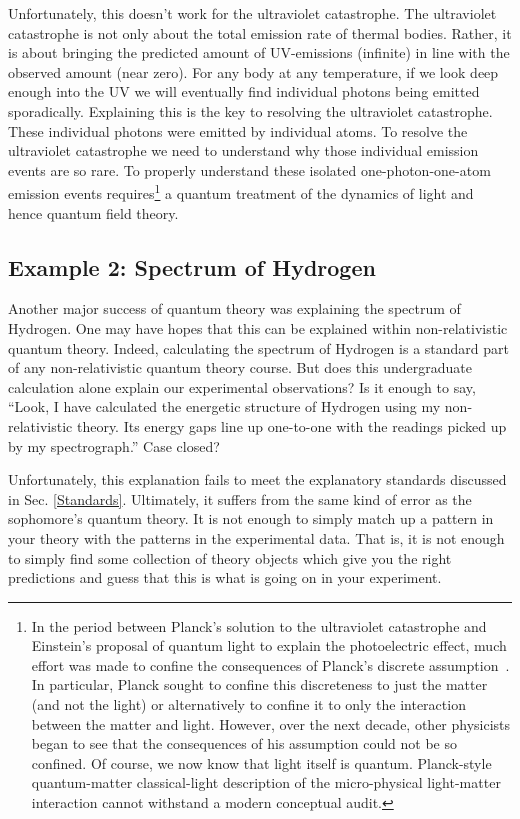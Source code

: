 \documentclass[12pt,prd,superscriptaddress,floatfix,amsmath,amssymb,amsfonts,nofootinbib]{revtex4-2}
\begin{document}
Unfortunately, this doesn't work for the ultraviolet catastrophe. The ultraviolet catastrophe is not only about the total emission rate of thermal bodies. Rather, it is about bringing the predicted amount of UV-emissions (infinite) in line with the observed amount (near zero). For any body at any temperature, if we look deep enough into the UV we will eventually find individual photons being emitted sporadically. Explaining this is the key to resolving the ultraviolet catastrophe. These individual photons were emitted by individual atoms. To resolve the ultraviolet catastrophe we need to understand why those individual emission events are so rare. To properly understand these isolated one-photon-one-atom emission events requires\footnote{In the period between Planck's solution to the ultraviolet catastrophe and Einstein's proposal of quantum light to explain the photoelectric effect, much effort was made to confine the consequences of Planck's discrete assumption~\cite{PlanckHistory}. In particular, Planck sought to confine this discreteness to just the matter (and not the light) or alternatively to confine it to only the interaction between the matter and light. However, over the next decade, other physicists began to see that the consequences of his assumption could not be so confined. Of course, we now know that light itself is quantum. Planck-style quantum-matter classical-light description of the micro-physical light-matter interaction cannot withstand a modern conceptual audit.} a quantum treatment of the dynamics of light and hence quantum field theory.

\subsection{Example 2: Spectrum of Hydrogen}
Another major success of quantum theory was explaining the spectrum of Hydrogen. One may have hopes that this can be explained within non-relativistic quantum theory. Indeed, calculating the spectrum of Hydrogen is a standard part of any non-relativistic quantum theory course. But does this undergraduate calculation alone explain our experimental observations? Is it enough to say, ``Look, I have calculated the energetic structure of Hydrogen using my non-relativistic theory. Its energy gaps line up one-to-one with the readings picked up by my spectrograph.'' Case closed?

Unfortunately, this explanation fails to meet the explanatory standards discussed in Sec. \ref{Standards}. Ultimately, it suffers from the same kind of error as the sophomore's quantum theory. It is not enough to simply match up a pattern in your theory with the patterns in the experimental data. That is, it is not enough to simply find some collection of theory objects which give you the right predictions and guess that this is what is going on in your experiment.
\end{document}
